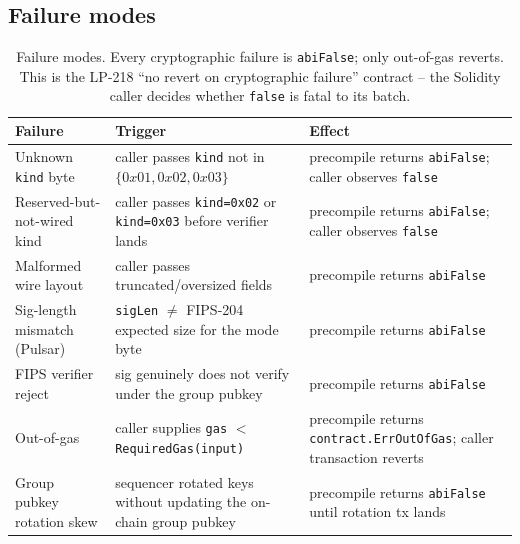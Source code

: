 \subsection{Failure modes}

\begin{table}[h]
\centering
\small
\begin{tabular}{@{}p{4.8cm}p{4cm}p{4.5cm}@{}}
\toprule
\textbf{Failure} & \textbf{Trigger} & \textbf{Effect} \\
\midrule
Unknown \texttt{kind} byte & caller passes
  \texttt{kind} not in $\{0x01, 0x02, 0x03\}$ &
  precompile returns \texttt{abiFalse}; caller observes \texttt{false} \\
Reserved-but-not-wired kind & caller passes \texttt{kind=0x02}
  or \texttt{kind=0x03} before verifier lands &
  precompile returns \texttt{abiFalse}; caller observes \texttt{false} \\
Malformed wire layout & caller passes truncated/oversized
  fields & precompile returns \texttt{abiFalse} \\
Sig-length mismatch (Pulsar) & \texttt{sigLen} $\neq$ FIPS-204
  expected size for the mode byte & precompile returns
  \texttt{abiFalse} \\
FIPS verifier reject & sig genuinely does not verify under the
  group pubkey & precompile returns \texttt{abiFalse} \\
Out-of-gas & caller supplies
  \texttt{gas} $<$ \texttt{RequiredGas(input)} & precompile
  returns \texttt{contract.ErrOutOfGas}; caller transaction reverts \\
Group pubkey rotation skew & sequencer rotated keys without
  updating the on-chain group pubkey & precompile returns
  \texttt{abiFalse} until rotation tx lands \\
\bottomrule
\end{tabular}
\caption{Failure modes. Every cryptographic failure is
\texttt{abiFalse}; only out-of-gas reverts. This is the LP-218
``no revert on cryptographic failure'' contract -- the
Solidity caller decides whether \texttt{false} is fatal to its
batch.}
\label{tab:failures}
\end{table}
